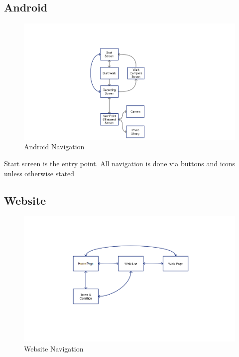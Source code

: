 \documentclass[12pt]{article}
\begin{document}
\subsection{Android}
\begin{figure}[htp]
\begin{adjustwidth}{-3.cm}{-4cm}
\centering
\includegraphics[scale=0.6]{Project_Plan/docs/android_navigation_01.png}
\caption{Android Navigation}
\label{Android Navigation}
\end{adjustwidth}
\end{figure}
\par{Start screen is the entry point. All navigation is done via buttons and icons unless otherwise stated}
\clearpage
\subsection{Website}
\begin{figure}[htp]
\begin{adjustwidth}{-3cm}{-3cm}
\centering
\includegraphics[scale=0.6]{Project_Plan/docs/website_navigation_01.png}

\caption{Website Navigation}
\label{Website Navigation}
\end{adjustwidth}
\end{figure}
\end{document}
